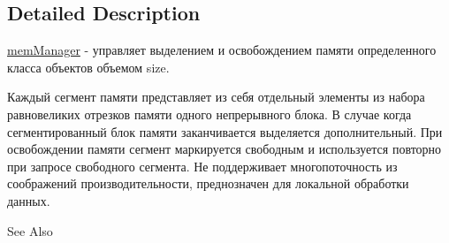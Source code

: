 \subsection{Detailed Description}
\hyperlink{classbt_1_1mem_manager}{mem\-Manager} -\/ управляет выделением и освобождением памяти определенного класса объектов объемом size. 

Каждый сегмент памяти представляет из себя отдельный элементы из набора равновеликих отрезков памяти одного непрерывного блока. В случае когда сегментированный блок памяти заканчивается выделяется дополнительный. При освобождении памяти сегмент маркируется свободным и используется повторно при запросе свободного сегмента. Не поддерживает многопоточность из соображений производительности, преднозначен для локальной обработки данных.

\begin{DoxySeeAlso}{See Also}

\end{DoxySeeAlso}
